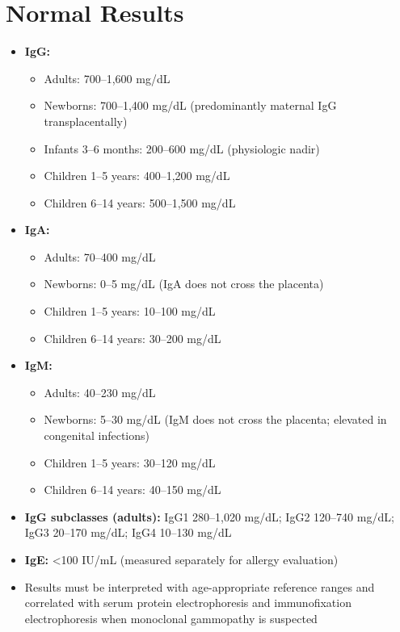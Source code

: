 \section*{Normal Results}
\begin{itemize}
  \item \textbf{IgG:}
  \begin{itemize}
    \item Adults: 700--1,600 mg/dL
    \item Newborns: 700--1,400 mg/dL (predominantly maternal IgG transplacentally)
    \item Infants 3--6 months: 200--600 mg/dL (physiologic nadir)
    \item Children 1--5 years: 400--1,200 mg/dL
    \item Children 6--14 years: 500--1,500 mg/dL
  \end{itemize}
  \item \textbf{IgA:}
  \begin{itemize}
    \item Adults: 70--400 mg/dL
    \item Newborns: 0--5 mg/dL (IgA does not cross the placenta)
    \item Children 1--5 years: 10--100 mg/dL
    \item Children 6--14 years: 30--200 mg/dL
  \end{itemize}
  \item \textbf{IgM:}
  \begin{itemize}
    \item Adults: 40--230 mg/dL
    \item Newborns: 5--30 mg/dL (IgM does not cross the placenta; elevated in congenital infections)
    \item Children 1--5 years: 30--120 mg/dL
    \item Children 6--14 years: 40--150 mg/dL
  \end{itemize}
  \item \textbf{IgG subclasses (adults):} IgG1 280--1,020 mg/dL; IgG2 120--740 mg/dL; IgG3 20--170 mg/dL; IgG4 10--130 mg/dL
  \item \textbf{IgE:} <100 IU/mL (measured separately for allergy evaluation)
  \item Results must be interpreted with age-appropriate reference ranges and correlated with serum protein electrophoresis and immunofixation electrophoresis when monoclonal gammopathy is suspected
\end{itemize}

